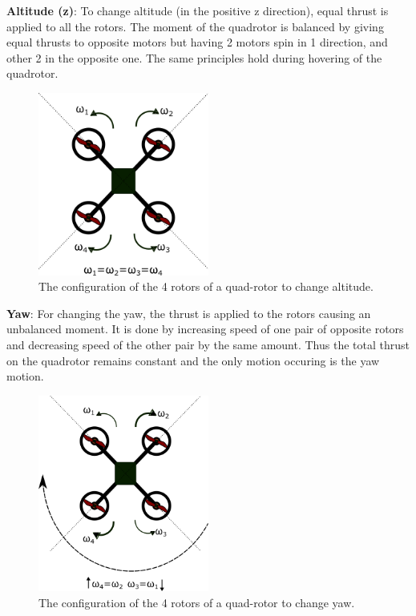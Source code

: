\documentclass[hidelinks,BTech]{iitmdiss}
\begin{document}
{\bf Altitude (z)}: To change altitude (in the positive z direction), equal thrust is applied to all the rotors. The moment of the quadrotor is balanced by giving equal thrusts to opposite motors but having 2 motors spin in 1 direction, and other 2 in the opposite one. The same principles hold during hovering of the quadrotor.
\begin{figure}[H]
  \centering
    \includegraphics[width=0.5\textwidth]{Quadrotor_altitude.png}
    \caption{The configuration of the 4 rotors of a quad-rotor to change altitude.}
\end{figure}

{\bf Yaw}: For changing the yaw, the thrust is applied to the rotors causing an unbalanced moment. It is done by increasing speed of one pair of opposite rotors and decreasing speed of the other pair by the same amount. Thus the total thrust on the quadrotor remains constant and the only motion occuring is the yaw motion.
\begin{figure}[H]
  \centering
    \includegraphics[width=0.5\textwidth]{Quadrotor_yaw.png}
    \caption{The configuration of the 4 rotors of a quad-rotor to change yaw.}
\end{figure}
\end{document}
